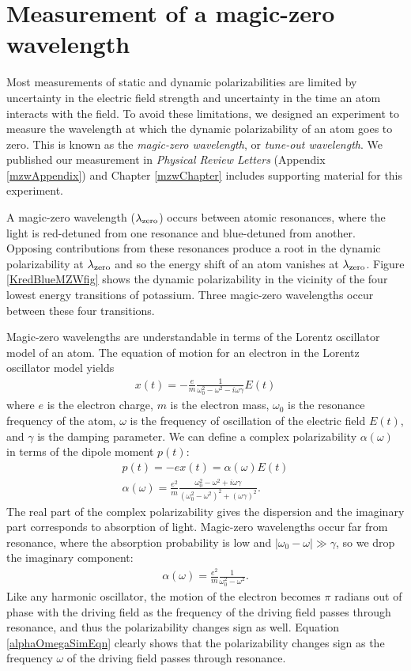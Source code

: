 \pagebreak
\section{Measurement of a magic-zero wavelength}
\label{mzwBrief}

Most measurements of static and dynamic polarizabilities are limited by uncertainty in the electric field strength and uncertainty in the time an atom interacts with the field. To avoid these limitations, we designed an experiment to measure the wavelength at which the dynamic polarizability of an atom goes to zero. This is known as the \emph{magic-zero wavelength}, or \emph{tune-out wavelength}. We published our measurement in \emph{Physical Review Letters} \cite{Hol12a} (Appendix \ref{mzwAppendix}) and Chapter \ref{mzwChapter} includes supporting material for this experiment.


A magic-zero wavelength ($\lambda_\textrm{zero}$) occurs between atomic resonances, where the light is red-detuned from one resonance and blue-detuned from another. Opposing contributions from these resonances produce a root in the dynamic polarizability at $\lambda_\textrm{zero}$ and so the energy shift of an atom vanishes at $\lambda_\textrm{zero}$. Figure \ref{KredBlueMZWfig} shows the dynamic polarizability in the vicinity of the four lowest energy transitions of potassium. Three magic-zero wavelengths occur between these four transitions.


Magic-zero wavelengths are understandable in terms of the Lorentz oscillator model of an atom. The equation of motion for an electron in the Lorentz oscillator model yields
\begin{eqnarray}
x(t)=-\frac{e}{m}\frac{1}{\omega_0^2-\omega^2-i\omega\gamma}E(t)
\end{eqnarray}
where $e$ is the electron charge, $m$ is the electron mass, $\omega_0$ is the resonance frequency of the atom, $\omega$ is the frequency of oscillation of the electric field $E(t)$, and $\gamma$ is the damping parameter. We can define a complex polarizability $\alpha(\omega)$ in terms of the dipole moment $p(t)$:
\begin{eqnarray}
p(t)=-ex(t)=\alpha(\omega) E(t)\\
\alpha(\omega)=\frac{e^2}{m}\frac{\omega_0^2-\omega^2+i\omega\gamma}{(\omega_0^2-\omega^2)^2+(\omega\gamma)^2}.
\end{eqnarray}
The real part of the complex polarizability gives the dispersion and the imaginary part corresponds to absorption of light. Magic-zero wavelengths occur far from resonance, where the absorption probability is low and $|\omega_0-\omega|\gg\gamma$, so we drop the imaginary component:
\begin{eqnarray}
\label{alphaOmegaSimEqn}
\alpha(\omega)=\frac{e^2}{m}\frac{1}{\omega_0^2-\omega^2}.
\end{eqnarray}
Like any harmonic oscillator, the motion of the electron becomes $\pi$ radians out of phase with the driving field as the frequency of the driving field passes through resonance, and thus the polarizability changes sign as well. Equation \ref{alphaOmegaSimEqn} clearly shows that the polarizability changes sign as the frequency $\omega$ of the driving field passes through resonance. 


